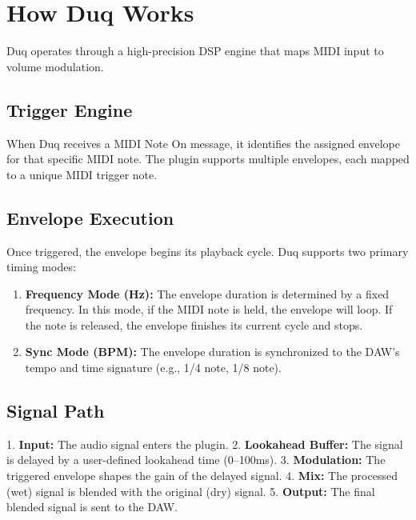 \chapter{How Duq Works}
\label{ch:how_it_works}

Duq operates through a high-precision DSP engine that maps MIDI input to volume modulation.

\section{Trigger Engine}
When Duq receives a MIDI Note On message, it identifies the assigned envelope for that specific MIDI note. The plugin supports multiple envelopes, each mapped to a unique MIDI trigger note.

\section{Envelope Execution}
Once triggered, the envelope begins its playback cycle. Duq supports two primary timing modes:
\begin{enumerate}
    \item \textbf{Frequency Mode (Hz):} The envelope duration is determined by a fixed frequency. In this mode, if the MIDI note is held, the envelope will loop. If the note is released, the envelope finishes its current cycle and stops.
    \item \textbf{Sync Mode (BPM):} The envelope duration is synchronized to the DAW's tempo and time signature (e.g., 1/4 note, 1/8 note).
\end{enumerate}

\section{Signal Path}
1. \textbf{Input:} The audio signal enters the plugin.
2. \textbf{Lookahead Buffer:} The signal is delayed by a user-defined lookahead time (0--100ms).
3. \textbf{Modulation:} The triggered envelope shapes the gain of the delayed signal.
4. \textbf{Mix:} The processed (wet) signal is blended with the original (dry) signal.
5. \textbf{Output:} The final blended signal is sent to the DAW.
